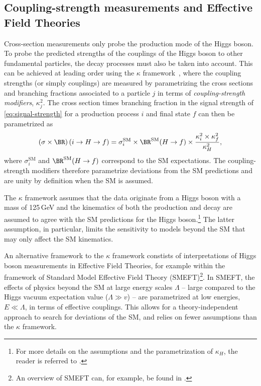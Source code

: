\subsection{Coupling-strength measurements and Effective Field Theories}
\label{subsec:coupling-measurements}
Cross-section measurements only probe the production mode of the Higgs boson.
To probe the predicted strengths of the couplings of the Higgs boson to other fundamental particles, the decay processes must also be taken into account.
This can be achieved at leading order using the $\kappa$ framework~\cite{LHCHandbookV3}, where the coupling strengths (or simply couplings) are measured by parametrizing the cross sections and branching fractions associated to a particle $j$ in terms of \emph{coupling-strength modifiers}, $\kappa_j^2$.
The cross section times branching fraction in the signal strength of \cref{eq:signal-strength} for a production process $i$ and final state $f$ can then be parametrized as
\begin{equation}
  \label{eq:kappa-parametrization}
  \left( \sigma \times  \BR \right) (i \to H \to f)  =  \sigma_{i}^\mathrm{SM} \times \BR^\mathrm{SM}(H \to f) \times \frac{\kappa_i^2 \times  \kappa_f^2}{\kappa_H^2}, 
\end{equation}
where $\sigma_{i}^\mathrm{SM}$ and $\BR^\mathrm{SM}(H \to f)$ correspond to the SM expectations. 
The coupling-strength modifiers therefore parametrize deviations from the SM predictions and are unity by definition when the SM is assumed.

The $\kappa$ framework assumes that the data originate from a Higgs boson with a mass of 125\,GeV and the kinematics of both the production and decay are assumed to agree with the SM predictions for the Higgs boson.\footnote{For more details on the assumptions and the parametrization of $\kappa_H$, the reader is referred to .}
The latter assumption, in particular, limits the sensitivity to models beyond the SM that may only affect the SM kinematics. 

An alternative framework to the $\kappa$ framework constists of interpretations of Higgs boson measurements in Effective Field Theories, for example within the framework of Standard Model Effective Field Theory (SMEFT)\footnote{An overview of SMEFT can, for example, be found in .}.
In SMEFT, the effects of physics beyond the SM at large energy scales $\Lambda$ -- large compared to the Higgs vacuum expectation value ($\Lambda \gg v$) -- are parametrized at low energies, $E \ll \Lambda$, in terms of effective couplings. 
This allows for a theory-independent approach to search for deviations of the SM, and relies on fewer assumptions than the $\kappa$ framework. 

